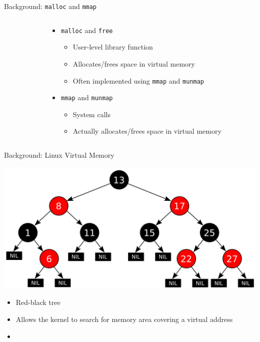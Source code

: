 \documentclass[aspectratio=169]{beamer}
\newcommand{\bi}{\begin{itemize}}
\newcommand{\ei}{\end{itemize}}
\begin{document}
\begin{frame}{Background: \texttt{malloc} and \texttt{mmap}}
\begin{columns}[T]
\begin{column}{0.2\textwidth}
    \end{column}
    \begin{column}{0.8\textwidth}
      \bi
    \item \texttt{malloc} and \texttt{free}
      \bi
    \item User-level library function
    \item Allocates/frees space in virtual memory
    \item Often implemented using \texttt{mmap} and \texttt{munmap}
      \ei
    \item \texttt{mmap} and \texttt{munmap}
      \bi
    \item System calls
    \item Actually allocates/frees space in virtual memory
      \ei
      \ei
    \end{column}
  \end{columns}
\end{frame}

\begin{frame}{Background: Linux Virtual Memory}
  \begin{center}
    \includegraphics[scale=0.2]{./figures/Red-black_tree.png}
  \end{center}
    \bi
    \item Red-black tree
    \item Allows the kernel to search for memory area covering a virtual address
      \pause
    \item \color{red}{Problem: A single lock per address space!}
    \ei
\end{frame}
\end{document}
